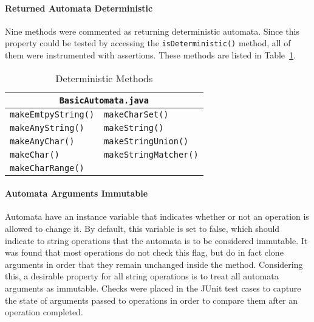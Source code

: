 \documentclass[letterpaper,sigplan]{acmart}
\begin{document}
\paragraph{Returned Automata Deterministic} Nine methods were commented as
returning deterministic automata.  Since this property could be tested by
accessing the \lstinline{isDeterministic()} method, all of them were
instrumented with assertions. These methods are listed in
Table~\ref{tab:deterministic-methods}.

\begin{table}[h]
  {\footnotesize
    \begin{tabular}{ll}
      \toprule
      \multicolumn{2}{c}{\texttt{BasicAutomata.java}} \\
      \midrule
      \texttt{makeEmtpyString()} & \texttt{makeCharSet()} \\
      \midrule
      \texttt{makeAnyString()} & \texttt{makeString()} \\
      \midrule
      \texttt{makeAnyChar()} & \texttt{makeStringUnion()} \\
      \midrule
      \texttt{makeChar()} & \texttt{makeStringMatcher()} \\
      \midrule
      \texttt{makeCharRange()} & \\
      \bottomrule
    \end{tabular}
  }
  \caption{Deterministic Methods}%
  \label{tab:deterministic-methods}
\end{table}

\paragraph{Automata Arguments Immutable} Automata have an instance variable
that indicates whether or not an operation is allowed to change it.  By
default, this variable is set to false, which should indicate to string
operations that the automata is to be considered immutable.  It was found that
most operations do not check this flag, but do in fact clone arguments in order
that they remain unchanged inside the method.  Considering this, a desirable
property for all string operations is to treat all automata arguments as
immutable.  Checks were placed in the JUnit test cases to capture the state of
arguments passed to operations in order to compare them after an operation
completed.
\end{document}
